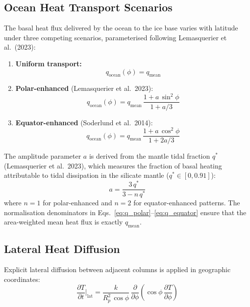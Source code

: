 \documentclass[11pt,a4paper]{article}
\newcommand{\pp}{\partial}
\begin{document}
\subsection{Ocean Heat Transport Scenarios}

The basal heat flux delivered by the ocean to the ice base varies with
latitude under three competing scenarios, parameterised following
Lemasquerier et al.\ (2023):

\begin{enumerate}[leftmargin=2em]
\item \textbf{Uniform transport:}
\begin{equation}
q_{\mathrm{ocean}}(\phi) = q_{\mathrm{mean}}
\end{equation}

\item \textbf{Polar-enhanced} (Lemasquerier et al.\ 2023):
\begin{equation}
q_{\mathrm{ocean}}(\phi) = q_{\mathrm{mean}}\,
  \frac{1 + a\,\sin^2\!\phi}{1 + a/3}
\label{eq:q_polar}
\end{equation}

\item \textbf{Equator-enhanced} (Soderlund et al.\ 2014):
\begin{equation}
q_{\mathrm{ocean}}(\phi) = q_{\mathrm{mean}}\,
  \frac{1 + a\,\cos^2\!\phi}{1 + 2a/3}
\label{eq:q_equator}
\end{equation}
\end{enumerate}

The amplitude parameter $a$ is derived from the mantle tidal fraction
$q^*$ (Lemasquerier et al.\ 2023), which measures the fraction of basal
heating attributable to tidal dissipation in the silicate mantle
($q^* \in [0, 0.91]$):
\begin{equation}
a = \frac{3\,q^*}{3 - n\,q^*}
\end{equation}
where $n = 1$ for polar-enhanced and $n = 2$ for equator-enhanced
patterns. The normalisation denominators in Eqs.~\ref{eq:q_polar}--\ref{eq:q_equator}
ensure that the area-weighted mean heat flux is exactly $q_{\mathrm{mean}}$.

\subsection{Lateral Heat Diffusion}

Explicit lateral diffusion between adjacent columns is applied in
geographic coordinates:
\begin{equation}
\frac{\pp T}{\pp t}\bigg|_{\mathrm{lat}}
  = \frac{k}{R_p^2\,\cos\phi}\,\frac{\pp}{\pp\phi}
    \left(\cos\phi\,\frac{\pp T}{\pp\phi}\right)
\label{eq:lateral}
\end{equation}
\end{document}
